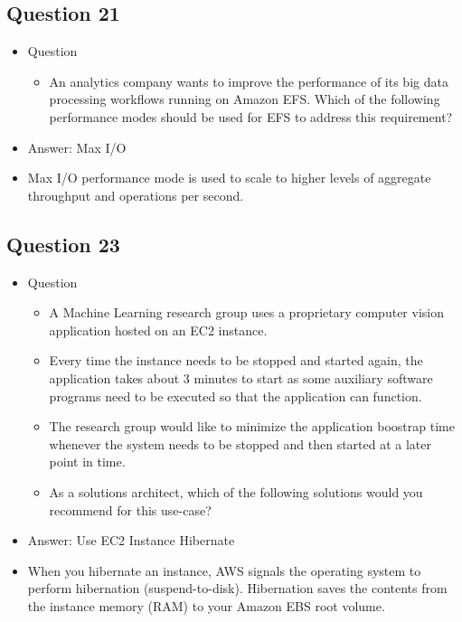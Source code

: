 \documentclass[]{scrartcl}
\begin{document}
\subsection{Question 21}
\begin{itemize}
	\item Question
	\begin{itemize}
		\item An analytics company wants to improve the performance of its big data processing workflows running on Amazon EFS. Which of the following performance modes should be used for EFS to address this requirement?
	\end{itemize}
	\item Answer: Max I/O
	\item Max I/O performance mode is used to scale to higher levels of aggregate throughput and operations per second.
\end{itemize}

\subsection{Question 23}
\begin{itemize}
	\item Question
	\begin{itemize}
		\item A Machine Learning research group uses a proprietary computer vision application hosted on an EC2 instance. 
		\item Every time the instance needs to be stopped and started again, the application takes about 3 minutes to start as some auxiliary software programs need to be executed so that the application can function. 
		\item The research group would like to minimize the application boostrap time whenever the system needs to be stopped and then started at a later point in time.
		\item As a solutions architect, which of the following solutions would you recommend for this use-case?
	\end{itemize}
	\item Answer: Use EC2 Instance Hibernate
	\item When you hibernate an instance, AWS signals the operating system to perform hibernation (suspend-to-disk). Hibernation saves the contents from the instance memory (RAM) to your Amazon EBS root volume. 
\end{itemize}
\end{document}
